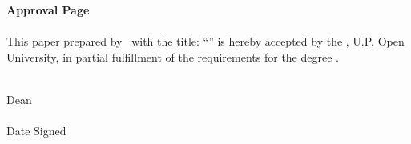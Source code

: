 \begin{approvalpage}
    \textbf{Approval Page} \\\\
    This paper prepared by \AUTHOR\ with the title: ``\TITLE'' is hereby accepted by the \FACULTY, U.P. Open University, in partial fulfillment of the requirements for the degree \DEGREE.\\

    \vspace{1in}
    \vspace{0.5in}

    \vspace{3in}
    \begin{centering}
    \textbf{\DEAN} \\
    Dean \\
    \FACULTY \\
    \vspace{0.5in}
    Date Signed \\
    \end{centering}
\end{approvalpage}